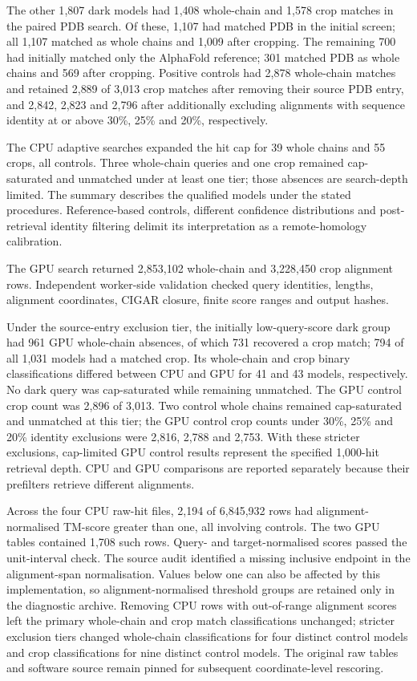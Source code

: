 The other 1{,}807 dark models had 1{,}408 whole-chain and 1{,}578 crop matches in the paired
PDB search. Of these, 1{,}107 had matched PDB in the initial screen; all 1{,}107 matched as
whole chains and 1{,}009 after cropping. The remaining 700 had initially matched only the
AlphaFold reference; 301 matched PDB as whole chains and 569 after cropping.
Positive controls had 2{,}878 whole-chain matches and retained 2{,}889 of 3{,}013 crop matches after removing their source PDB entry,
and 2{,}842, 2{,}823 and 2{,}796 after additionally excluding alignments with sequence identity
at or above 30\%, 25\% and 20\%, respectively.

The CPU adaptive searches expanded the hit cap
for 39 whole chains and 55 crops, all controls. Three whole-chain queries and one crop remained
cap-saturated and unmatched under at least one tier; those absences are search-depth limited.
The summary describes the qualified models under the stated procedures. Reference-based
controls, different confidence distributions and post-retrieval identity filtering delimit
its interpretation as a remote-homology calibration.

The GPU search returned 2{,}853{,}102 whole-chain and 3{,}228{,}450 crop alignment rows.
Independent worker-side validation checked query identities, lengths, alignment coordinates,
CIGAR closure, finite score ranges and output hashes.

Under the source-entry exclusion tier,
the initially low-query-score dark group had 961 GPU whole-chain absences, of which 731
recovered a crop match; 794 of all 1{,}031 models had a matched crop. Its whole-chain and crop
binary classifications differed between CPU and GPU for 41 and 43 models, respectively.
No dark query was cap-saturated while remaining unmatched. The GPU control crop count was
2{,}896 of 3{,}013. Two control whole chains remained cap-saturated and unmatched at this tier;
the GPU control crop counts under 30\%, 25\% and 20\% identity exclusions were 2{,}816,
2{,}788 and 2{,}753. With these stricter exclusions, cap-limited GPU control results represent the specified
1{,}000-hit retrieval depth. CPU and GPU comparisons are reported separately because their
prefilters retrieve different alignments.

Across the four CPU raw-hit files, 2{,}194 of 6{,}845{,}932 rows had alignment-normalised
TM-score greater than one, all involving controls. The two GPU tables contained 1{,}708 such
rows. Query- and target-normalised scores passed the unit-interval check. The source audit
identified a missing inclusive endpoint in the alignment-span normalisation. Values below one
can also be affected by this implementation, so alignment-normalised threshold groups are
retained only in the diagnostic archive. Removing CPU rows with out-of-range alignment scores
left the primary whole-chain and crop match classifications unchanged; stricter exclusion tiers
changed whole-chain classifications for four distinct control models and crop classifications
for nine distinct control models. The original raw tables and
software source remain pinned for subsequent coordinate-level rescoring.

